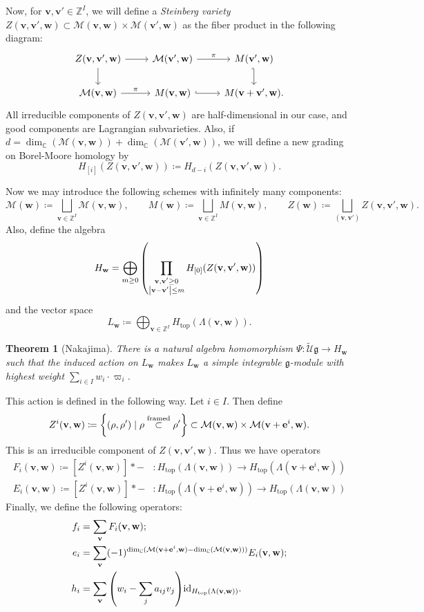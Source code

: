 \documentclass{amsart}
\newtheorem{thm}{Theorem}[section]
\theoremstyle{definition}
\theoremstyle{remark}
\theoremstyle{plain}
\theoremstyle{definition}
\theoremstyle{remark}
\newcommand{\C}{\mathbb{C}}
\newcommand{\Z}{\mathbb{Z}}
\newcommand{\g}{\mathfrak{g}}
\newcommand{\mc}[1]{\mathcal{#1}}
\newcommand{\mbf}[1]{\mathbf{#1}}
\newcommand{\mr}[1]{\mathrm{#1}}
\newcommand{\wt}[1]{\widetilde{#1}}
\newcommand{\1}{\mathbf{1}}
\newcommand{\2}{\mathbf{2}}
\newcommand{\3}{\mathbf{3}}
\renewcommand{\v}{\mbf{v}}
\newcommand{\w}{\mbf{w}}
\begin{document}
Now, for $\v, \v' \in \Z^I$, we will define a \textit{Steinberg variety} $Z(\v, \v', \w) \subset \mc{M}(\v, \w) \times \mc{M}(\v', \w)$ as the fiber product in the following diagram:
\begin{equation*}
\begin{tikzcd}
    Z(\v, \v', \w) \ar{r} \ar{d} & \mc{M}(\v', \w) \ar{r}{\pi} & M(\v', \w)  \\
    \mc{M}(\v, \w) \ar{r}{\pi} & M(\v, \w) \ar[hookrightarrow]{r} & M(\v+\v', \w).\ar[hookleftarrow]{u}
\end{tikzcd}
\end{equation*}
All irreducible components of $Z(\v, \v', \w)$ are half-dimensional in our case, and good components are Lagrangian subvarieties. Also, if $d = \dim_{\C}(\mc{M}(\v, \w)) + \dim_{\C}(\mc{M}(\v', \w))$, we will define a new grading on Borel-Moore homology by
\[ H_{[i]}(Z(\v, \v', \w)) \coloneqq H_{d-i}(Z(\v, \v', \w)). \]

Now we may introduce the following schemes with infinitely many components:
\[ \mc{M}(\w) \coloneqq \bigsqcup_{\v \in \Z^I} \mc{M}(\v, \w), \qquad M(\w) \coloneqq \bigsqcup_{\v \in \Z^I}M(\v, \w), \qquad Z(\w) \coloneqq \bigsqcup_{(\v, \v')} Z(\v, \v', \w). \]
Also, define the algebra
\[ H_{\w} = \bigoplus_{m \geq 0} \qty(\prod_{\substack{\v, \v' \geq 0 \\ \abs{\v-\v'} \leq m}} H_{[0]}(Z(\v, \v', \w))) \]
and the vector space
\[ L_{\w} \coloneqq \bigoplus_{\v \in \Z^I} H_{\mr{top}}(\Lambda(\v, \w)). \]
\begin{thm}[Nakajima]
    There is a natural algebra homomorphism $\Psi \colon \wt{\mc{U}}\g \to H_{\w}$ such that the induced action on $L_{\w}$ makes $L_{\w}$ a simple integrable $\g$-module with highest weight $\sum_{i \in I} w_i \cdot \varpi_i$.
\end{thm}

This action is defined in the following way. Let $i \in I$. Then define
\[ Z^i(\v, \w) \coloneqq \qty{(\rho, \rho') \mid \rho \overset{\text{framed}}{\subset} \rho'} \subset \mc{M}(\v, \w) \times \mc{M}(\v + \mbf{e}^i, \w). \]
This is an irreducible component of $Z(\v, \v', \w)$. Thus we have operators 
\begin{align*}
    F_i(\v, \w) \coloneqq [Z^i(\v, \w)] * - &\colon H_{\mr{top}}(\Lambda(\v, \w)) \to H_{\mr{top}}(\Lambda(\v + \mbf{e}^i, \w)) \\
    E_i(\v, \w) \coloneqq [Z^i(\v, \w)] * - &\colon H_{\mr{top}}(\Lambda(\v + \mbf{e}^i, \w)) \to H_{\mr{top}}(\Lambda(\v, \w))
\end{align*}
Finally, we define the following operators:
\begin{align*}
    f_i &= \sum_{\v} F_i(\v, \w); \\
    e_i &= \sum_{\v} (-1)^{\dim_{\C}(\mc{M}(\v+\mbf{e}^i, \w) - \dim_{\C}(\mc{M}(\v, \w)))} E_i(\v, \w); \\
    h_i &= \sum_{\v} \qty(w_i - \sum_j a_{ij} v_j) \mr{id}_{H_{\mr{top}}(\Lambda(\v, \w))}.
\end{align*}
\end{document}

